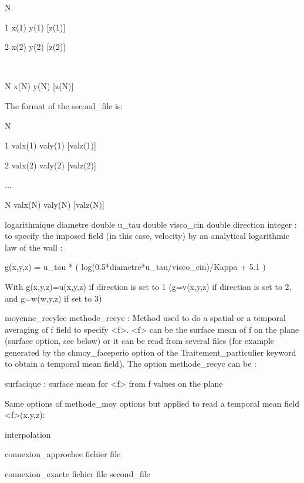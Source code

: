 	N

	1 x(1) y(1) [z(1)]

2 x(2) y(2) [z(2)]

~

N x(N) y(N) [z(N)]

The format of the second\_file is:

N

	1 valx(1) valy(1) [valz(1)]

2 valx(2) valy(2) [valz(2)]

...

N valx(N) valy(N) [valz(N)]



logarithmique diametre double u\_tau double visco\_cin double direction integer : to specify the imposed field (in this case, velocity) by an analytical  logarithmic law of the wall :

g(x,y,z) = u\_tau * ( log(0.5*diametre*u\_tau/visco\_cin)/Kappa + 5.1 ) 

With g(x,y,z)=u(x,y,z) if direction is set to 1 (g=v(x,y,z) if direction is set to 2, and g=w(w,y,z) if set to 3)



moyenne\_recylee methode\_recyc : Method used to do a spatial or a temporal averaging of f field to specify <f>. <f> can be the surface mean of f on the plane (surface option, see below) or it can be read from several files (for example generated by the chmoy\_faceperio option of the Traitement\_particulier keyword to obtain a temporal mean field). The option methode\_recyc can be :

surfacique : surface mean for <f> from f values on the plane

Same options of methode\_moy options but applied to read a temporal mean field <f>(x,y,z):

interpolation

connexion\_approchee fichier file

connexion\_exacte fichier file second\_file
